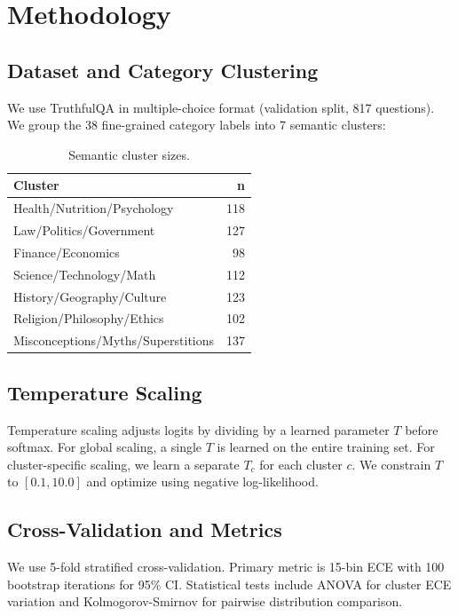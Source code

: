 \section{Methodology}

\subsection{Dataset and Category Clustering}

We use TruthfulQA in multiple-choice format (validation split, 817 questions). We group the 38 fine-grained category labels into 7 semantic clusters:

\begin{table}[h]
\centering
\begin{tabular}{@{}lr@{}}
\toprule
\textbf{Cluster} & \textbf{n} \\
\midrule
Health/Nutrition/Psychology & 118 \\
Law/Politics/Government & 127 \\
Finance/Economics & 98 \\
Science/Technology/Math & 112 \\
History/Geography/Culture & 123 \\
Religion/Philosophy/Ethics & 102 \\
Misconceptions/Myths/Superstitions & 137 \\
\bottomrule
\end{tabular}
\caption{Semantic cluster sizes.}
\label{tab:clusters}
\end{table}

\subsection{Temperature Scaling}

Temperature scaling adjusts logits by dividing by a learned parameter $T$ before softmax. For global scaling, a single $T$ is learned on the entire training set. For cluster-specific scaling, we learn a separate $T_c$ for each cluster $c$. We constrain $T$ to $[0.1, 10.0]$ and optimize using negative log-likelihood.

\subsection{Cross-Validation and Metrics}

We use 5-fold stratified cross-validation. Primary metric is 15-bin ECE with 100 bootstrap iterations for 95\% CI. Statistical tests include ANOVA for cluster ECE variation and Kolmogorov-Smirnov for pairwise distribution comparison.
